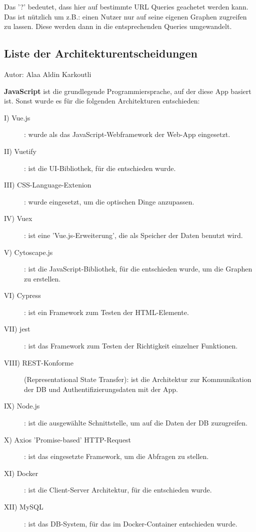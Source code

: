 \documentclass[twoside]{report}
\begin{document}
Das '?' bedeutet, dass hier auf bestimmte URL Queries geachetet werden kann.
Das ist nützlich um z.B.: einen Nutzer nur auf seine eigenen Graphen zugreifen zu lassen.
Diese werden dann in die entsprechenden Queries umgewandelt.\\

\subsection{Liste der Architekturentscheidungen}
{\small Autor: Alaa Aldin Karkoutli}\newline

\textbf{JavaScript} ist die grundlegende Programmiersprache, auf der diese App basiert ist. Sonst wurde es für die folgenden Architekturen entschieden:
\begin{description}
    \item [I) Vue.js]: wurde als das JavaScript-Webframework der Web-App eingesetzt. 
    \item [II) Vuetify]: ist die UI-Bibliothek, für die entschieden wurde.  
    \item [III) CSS-Language-Extenion]: wurde eingesetzt, um die optischen Dinge anzupassen.
    \item [IV) Vuex]: ist eine 'Vue.js-Erweiterung', die als Speicher der Daten benutzt wird.
    \item [V) Cytoscape.js]: ist die JavaScript-Bibliothek, für die entschieden wurde, um die Graphen zu erstellen.
    \item [VI) Cypress]: ist ein Framework zum Testen der HTML-Elemente.
    \item [VII) jest]: ist das Framework zum Testen der Richtigkeit einzelner Funktionen.
    \item [VIII) REST-Konforme] (Representational State Transfer): ist die Architektur zur Kommunikation der DB und Authentifizierungsdaten mit der App.
    \item [IX) Node.js]: ist die ausgewählte Schnittstelle, um auf die Daten der DB zuzugreifen.
    \item [X) Axios 'Promise-based' HTTP-Request]: ist das eingesetzte Framework, um die Abfragen zu stellen. 
    \item [XI) Docker]: ist die Client-Server Architektur, für die entschieden wurde.
    \item [XII) MySQL]: ist das DB-System, für das im Docker-Container entschieden wurde.  
\end{description}
\end{document}
